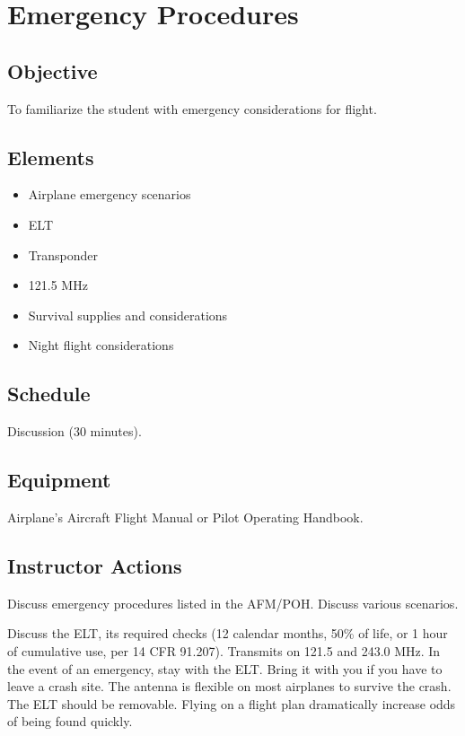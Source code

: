 \chapter{Emergency Procedures}

\section{Objective}

To familiarize the student with emergency considerations for flight.

\section{Elements}

\begin{itemize}
  \item Airplane emergency scenarios
  \item ELT
  \item Transponder
  \item 121.5 MHz
  \item Survival supplies and considerations
  \item Night flight considerations
\end{itemize}

\section{Schedule}

Discussion (30 minutes).

\section{Equipment}

Airplane’s Aircraft Flight Manual or Pilot Operating Handbook.

\section{Instructor Actions}

Discuss emergency procedures listed in the AFM/POH. Discuss various scenarios.

Discuss the ELT, its required checks (12 calendar months, 50\% of life, or 1
hour of cumulative use, per 14 CFR 91.207). Transmits on 121.5 and 243.0 MHz.
In the event of an emergency, stay with the ELT. Bring it with you if you have
to leave a crash site. The antenna is flexible on most airplanes to survive the
crash. The ELT should be removable. Flying on a flight plan dramatically
increase odds of being found quickly.

